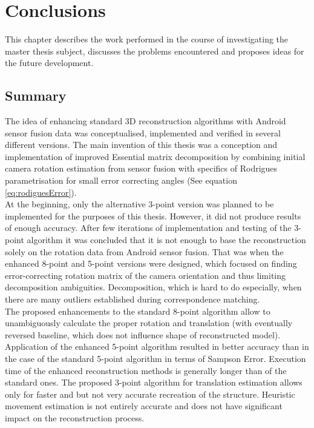 
\chapter{Conclusions} %
This chapter describes the work performed in the course of investigating the master thesis subject, discusses the problems encountered and proposes ideas for the future development.

\section{Summary}
The idea of enhancing standard 3D reconstruction algorithms with Android sensor fusion data was conceptualised, implemented and verified in several different versions. The main invention of this thesis was a conception and implementation of improved Essential matrix decomposition by combining initial camera rotation estimation from sensor fusion with specifics of Rodrigues parametrisation for small error correcting angles (See equation \ref{eq:rodiguesError}). \\
At the beginning, only the alternative 3-point version was planned to be implemented for the purposes of this thesis. However, it did not produce results of enough accuracy. After few iterations of implementation and testing of the 3-point algorithm it was concluded that it is not enough to base the reconstruction solely on the rotation data from Android sensor fusion. That was when the enhanced 8-point and 5-point versions were designed, which focused on finding error-correcting rotation matrix of the camera orientation and thus limiting decomposition ambiguities. Decomposition, which is hard to do especially, when there are many outliers established during correspondence matching. \\
The proposed enhancements to the standard 8-point algorithm allow to unambiguously calculate the proper rotation and translation (with eventually reversed baseline, which does not influence shape of reconstructed model). Application of the enhanced 5-point algorithm resulted in better accuracy than in the case of the standard 5-point algorithm in terms of Sampson Error. Execution time of the enhanced reconstruction methods is generally longer than of the standard ones. 
The proposed 3-point algorithm for translation estimation allows only for faster and but not very accurate recreation of the structure. Heuristic movement estimation is not entirely accurate and does not have significant impact on the reconstruction process. \\
